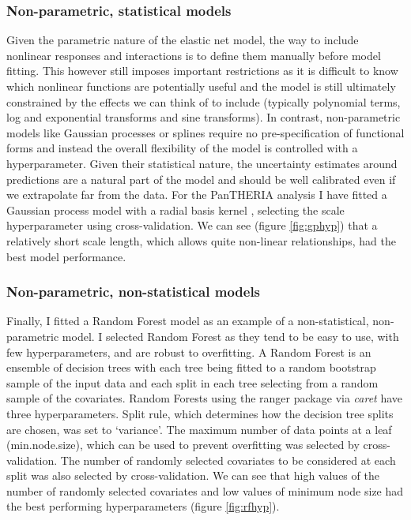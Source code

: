 \documentclass[12pt,]{article}
\begin{document}
\subsubsection{Non-parametric, statistical models}\label{non-parametric-statistical-models}

Given the parametric nature of the elastic net model, the way to include nonlinear responses and interactions is to define them manually before model fitting.
This however still imposes important restrictions as it is difficult to know which nonlinear functions are potentially useful and the model is still ultimately constrained by the effects we can think of to include (typically polynomial terms, log and exponential transforms and sine transforms).
In contrast, non-parametric models like Gaussian processes \citep{rasmussen2004gaussian} or splines \citep{splines} require no pre-specification of functional forms and instead the overall flexibility of the model is controlled with a hyperparameter.
Given their statistical nature, the uncertainty estimates around predictions are a natural part of the model and should be well calibrated even if we extrapolate far from the data.
For the PanTHERIA analysis I have fitted a Gaussian process model with a radial basis kernel \citep{kernlab}, selecting the scale hyperparameter using cross-validation.
We can see (figure \ref{fig:gphyp}) that a relatively short scale length, which allows quite non-linear relationships, had the best model performance.

\subsubsection{Non-parametric, non-statistical models}\label{non-parametric-non-statistical-models}

Finally, I fitted a Random Forest model \citep{breiman2001random, wright2015ranger} as an example of a non-statistical, non-parametric model.
I selected Random Forest as they tend to be easy to use, with few hyperparameters, and are robust to overfitting.
A Random Forest is an ensemble of decision trees with each tree being fitted to a random bootstrap sample of the input data and each split in each tree selecting from a random sample of the covariates.
Random Forests using the ranger  package \citep{wright2015ranger} via \emph{caret} have three hyperparameters.
Split rule, which determines how the decision tree splits are chosen, was set to `variance'.
The maximum number of data points at a leaf (min.node.size), which can be used to prevent overfitting was selected by cross-validation.
The number of randomly selected covariates to be considered at each split  was also selected by cross-validation.
We can see that high values of the number of randomly selected covariates and low values of minimum node size had the best performing hyperparameters (figure \ref{fig:rfhyp}).
\end{document}
